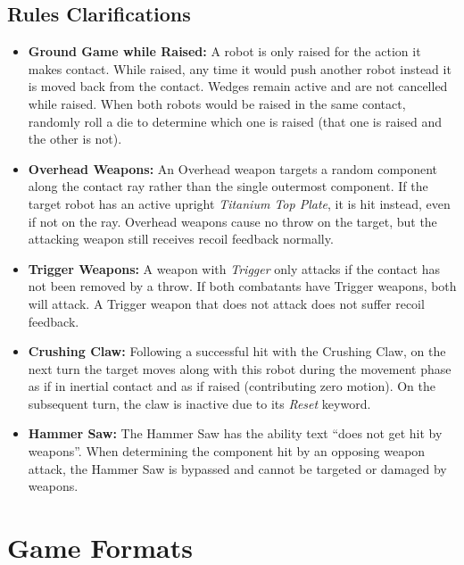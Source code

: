 \documentclass[11pt,a4paper]{article}
\begin{document}
\subsection{Rules Clarifications}
\begin{itemize}[leftmargin=*, itemsep=2pt, topsep=1pt, parsep=0pt]
  \item \textbf{Ground Game while Raised:} A robot is only raised for the action it makes contact. While raised, any time it would push another robot instead it is moved back from the contact. Wedges remain active and are not cancelled while raised. When both robots would be raised in the same contact, randomly roll a die to determine which one is raised (that one is raised and the other is not).
  \item \textbf{Overhead Weapons:} An Overhead weapon targets a random component along the contact ray rather than the single outermost component. If the target robot has an active upright \textit{Titanium Top Plate}, it is hit instead, even if not on the ray. Overhead weapons cause no throw on the target, but the attacking weapon still receives recoil feedback normally.
  \item \textbf{Trigger Weapons:} A weapon with \textit{Trigger} only attacks if the contact has not been removed by a throw. If both combatants have Trigger weapons, both will attack. A Trigger weapon that does not attack does not suffer recoil feedback.
  \item \textbf{Crushing Claw:} Following a successful hit with the Crushing Claw, on the next turn the target moves along with this robot during the movement phase as if in inertial contact and as if raised (contributing zero motion). On the subsequent turn, the claw is inactive due to its \textit{Reset} keyword.
  \item \textbf{Hammer Saw:} The Hammer Saw has the ability text ``does not get hit by weapons''. When determining the component hit by an opposing weapon attack, the Hammer Saw is bypassed and cannot be targeted or damaged by weapons.
\end{itemize}

\clearpage


\section{Game Formats}
\end{document}

